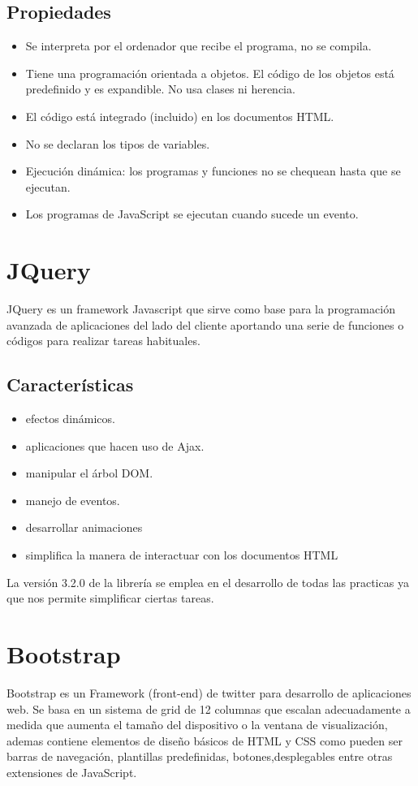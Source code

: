 \subsection{Propiedades}
\begin{itemize}
\item Se interpreta por el ordenador que recibe el programa, no se compila.
\item Tiene una programación orientada a objetos. El código de los objetos está predefinido y es expandible. No usa clases ni herencia.
\item El código está integrado (incluido) en los documentos HTML.
\item No se declaran los tipos de variables.
\item Ejecución dinámica: los programas y funciones no se chequean hasta que se ejecutan.
\item Los programas de JavaScript se ejecutan cuando sucede un evento. 
\end{itemize}
\section{JQuery}
JQuery\cite{jquery}\cite{jqueryOficial} es un framework Javascript que sirve como base para la programación avanzada  de aplicaciones del lado del cliente aportando una serie de funciones o códigos para realizar tareas habituales.
\subsection{Características}
\begin{itemize}
\item efectos dinámicos.
\item aplicaciones que hacen uso de Ajax.
\item manipular el árbol DOM.
\item manejo de eventos.
\item desarrollar animaciones
\item simplifica la manera de interactuar con los documentos HTML
\end{itemize}
La versión 3.2.0 de la librería se emplea en el desarrollo de todas las practicas ya que nos permite simplificar ciertas tareas.
\section{Bootstrap}
Bootstrap\cite{bootstrap}\cite{bootstrapOfi} es un Framework (front-end) de twitter para desarrollo de aplicaciones web. Se basa en un sistema de grid de 12 columnas que escalan adecuadamente a medida que aumenta el tamaño del dispositivo o la ventana de visualización, ademas contiene elementos de diseño básicos de HTML y CSS como pueden ser barras de navegación, plantillas predefinidas, botones,desplegables entre otras extensiones de JavaScript.
